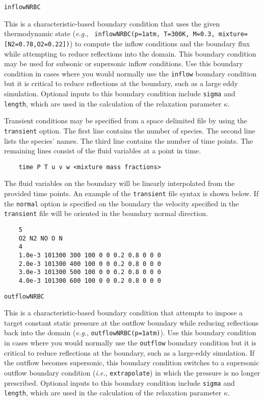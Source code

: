 \documentclass{article}
\begin{document}
  \begin{list}{}{}

    
  \item {\tt inflowNRBC}

    This is a characteristic-based boundary condition
    that uses the given thermodynamic state ({\it{e.g.}}, {\tt
      inflowNRBC(p=1atm, T=300K, M=0.3, mixture=[N2=0.78,O2=0.22])}) to compute the inflow conditions and the boundary flux while attempting to reduce reflections into the domain.  This
    boundary condition may be used for subsonic or supersonic inflow
    conditions. Use this boundary condition in cases where you would normally use the {\tt inflow} boundary condition but it is critical to reduce reflections at the boundary, such as a large eddy simulation. Optional inputs to this boundary condition include {\tt sigma} and {\tt length}, which are used in the calculation of the relaxation parameter {\tt $\kappa$}. 
    
    Transient conditions may be specified from a space delimited file by using the {\tt transient} option. The first line contains the number of species. The second line lists the species' names. The third line contains the number of time points. The remaining lines consist of the fluid variables at a point in time. 
    
\begin{verbatim}
    time P T u v w <mixture mass fractions>
\end{verbatim}
    
    The fluid variables on the boundary will be linearly interpolated from the provided time points. An example of the {\tt transient} file syntax is shown below. If the {\tt normal} option is specified on the boundary the velocity specified in the {\tt transient} file will be oriented in the boundary normal direction.
    
\begin{verbatim}
    5
    O2 N2 NO O N
    4
    1.0e-3 101300 300 100 0 0 0.2 0.8 0 0 0
    2.0e-3 101300 400 100 0 0 0.2 0.8 0 0 0
    3.0e-3 101300 500 100 0 0 0.2 0.8 0 0 0
    4.0e-3 101300 600 100 0 0 0.2 0.8 0 0 0
\end{verbatim}

  \item {\tt outflowNRBC}
    
    This is a characteristic-based boundary condition that attempts to impose a target constant static pressure at the outflow boundary while reducing reflections back into the domain ({\it{e.g.}}, {\tt outflowNRBC(p=1atm)}).  Use this boundary condition in cases where you would normally use the {\tt outflow} boundary condition but it is critical to reduce reflections at the boundary, such as a large-eddy simulation.  If the outflow becomes supersonic, this boundary condition switches to a supersonic outflow boundary condition ({\it{i.e.}}, {\tt extrapolate}) in which the pressure is no longer prescribed. Optional inputs to this boundary condition include {\tt sigma} and {\tt length}, which are used in the calculation of the relaxation parameter {\tt $\kappa$}.


\end{list}
\end{document}
